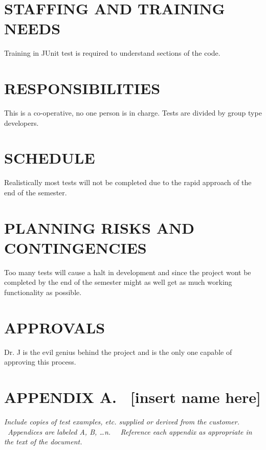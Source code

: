 {{{\section[STAFFING AND TRAINING NEEDS]{\bfseries\color{black} STAFFING AND TRAINING NEEDS}
{\itshape\color{black}

{\color{black}
Training in JUnit test is required to understand sections of the code. 
}

\section[RESPONSIBILITIES]{\bfseries\color{black} RESPONSIBILITIES}
{\itshape\color{black}

{\color{black}
This is a co-operative, no one person is in charge. Tests are divided by group type developers. 
}

\section[SCHEDULE]{\bfseries\color{black} SCHEDULE}
{\itshape\color{black}


{\color{black}
Realistically most tests will not be completed due to the rapid approach of the end of the semester.  
}

\section[PLANNING RISKS AND CONTINGENCIES]{\bfseries\color{black} PLANNING RISKS AND CONTINGENCIES}

{\color{black}
Too many tests will cause a halt in development and since the project wont be completed by the end of the semester might as well get as much working functionality as possible. 
}

\section[APPROVALS]{\bfseries\color{black} APPROVALS}
{\color{black}
Dr. J is the evil genius behind the project and is the only one capable of approving this process. 
}



\clearpage\setcounter{page}{1}\pagestyle{Convertviii}
\section[APPENDIX A. \ [insert name
here{]}]{\bfseries\color{black} APPENDIX A.
\ [insert name here]}
{\itshape\color{black}
Include copies of test examples, etc. supplied or
derived from the customer. \ Appendices are labeled A, B, {\dots}n.
\ \ Reference each appendix as appropriate in the text of the document.
}

}}}}}}
